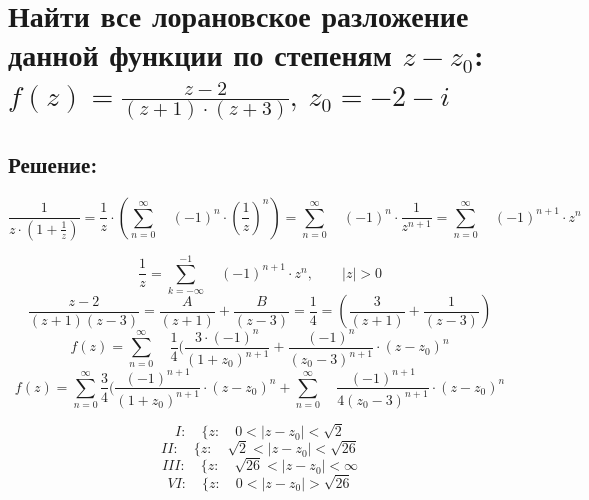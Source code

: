 \documentclass{article}
\begin{document}
        
        \section{Найти все лорановское разложение данной функции по степеням $z - z_0$: $f(z) = \frac{z - 2}{(z + 1) \cdot (z + 3)},\  z_0 = -2 -i $}
	\subsection{Решение:}
        $$\frac{1}{z \cdot (1 + \frac{1}{z})} = \frac{1}{z} \cdot (\sum\limits_{n=0}^{\infty} \quad (-1)^n \cdot (\frac{1}{z})^n) = \sum\limits_{n=0}^{\infty} \quad (-1)^n \cdot \frac{1}{z^{n + 1}} = \sum\limits_{n=0}^{\infty} \quad (-1)^{n + 1} \cdot z^n$$
        
	$$\frac{1}{z} = \sum\limits_{k=-\infty}^{-1} \quad (-1)^{n + 1} \cdot z^n, \quad \quad |z| > 0$$
        $$\frac{z -2 }{(z + 1)(z - 3)} = \frac{A}{(z + 1)} + \frac{B}{(z - 3)} = \frac{1}{4} = (\frac{3}{(z + 1)} + \frac{1}{(z - 3)})$$
        $$f(z) = \sum\limits_{n=0}^{\infty} \quad \frac{1}{4} (\frac{3\cdot(-1)^n}{(1 + z_0)^{n + 1}} + \frac{(-1)^n}{(z_0 - 3)^{n + 1}} \cdot (z - z_0)^n$$
	$$f(z) = \sum\limits_{n=0}^{\infty} \frac{3}{4} (\frac{(-1)^{n + 1}}{(1 + z_0)^{n + 1}} \cdot (z - z_0)^n + \sum\limits_{n=0}^{\infty} \quad \frac{(-1)^{n + 1}}{4(z_0 - 3)^{n + 1}} \cdot (z - z_0)^n$$

        $$I: \quad \{z: \quad 0 < |z - z_0| < \sqrt{2}$$
        $$II: \quad \{z: \quad \sqrt{2} < |z - z_0| < \sqrt{26}$$
        $$III: \quad \{z: \quad \sqrt{26} < |z - z_0| < \infty$$
        $$VI: \quad \{z: \quad 0 < |z - z_0| > \sqrt{26}$$
\end{document}
